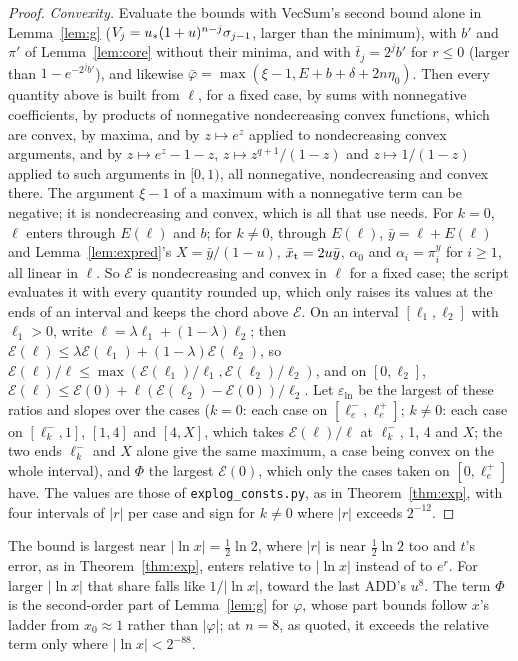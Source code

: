 \begin{proof}
\emph{Convexity.} Evaluate the bounds with VecSum's second bound alone in Lemma~\ref{lem:g} ($V_j = u_{*}(1+u)^{n-j}
\sigma_{j-1}$, larger than the minimum), with $b'$ and $\pi'$ of Lemma~\ref{lem:core} without their minima, and with
$\bar t_j = 2^jb'$ for $r \le 0$ (larger than $1 - e^{-2^jb'}$), and likewise $\bar \varphi = \max(\xi - 1, E + b + \delta +
2n\eta_0)$. Then every quantity above is built from $\ell$, for a fixed case, by sums with nonnegative coefficients, by
products of nonnegative nondecreasing convex functions, which are convex, by maxima, and by $z \mapsto e^z$ applied to
nondecreasing convex arguments, and by $z \mapsto e^z - 1 - z$, $z \mapsto z^{q+1}/(1 - z)$ and $z \mapsto 1/(1-z)$
applied to such arguments in $[0, 1)$, all nonnegative, nondecreasing and convex there. The argument $\xi - 1$ of a
maximum with a nonnegative term can be negative; it is nondecreasing and convex, which is all that use needs. For $k =
0$, $\ell$ enters through $E(\ell)$ and $b$; for $k \ne 0$, through $E(\ell)$, $\bar y = \ell + E(\ell)$ and
Lemma~\ref{lem:expred}'s $X = \bar y/(1-u)$, $\bar x_{\rm t} = 2u\bar y$, $\alpha_0$ and $\alpha_i = \pi^y_i$ for $i \ge
1$, all linear in $\ell$. So $\mathcal E$ is nondecreasing and convex in $\ell$ for a fixed case; the script evaluates
it with every quantity rounded up, which only raises its values at the ends of an interval and keeps the chord above
$\mathcal E$. On an interval $[\ell_1, \ell_2]$ with $\ell_1 > 0$, write $\ell = \lambda\ell_1 + (1 -
\lambda)\ell_2$; then $\mathcal E(\ell) \le \lambda\mathcal E(\ell_1) + (1-\lambda)\mathcal E(\ell_2)$, so $\mathcal
E(\ell)/\ell \le \max(\mathcal E(\ell_1)/\ell_1, \mathcal E(\ell_2)/\ell_2)$, and on $[0, \ell_2]$, $\mathcal E(\ell)
\le \mathcal E(0) + \ell(\mathcal E(\ell_2) - \mathcal E(0))/\ell_2$. Let $\varepsilon_{\ln}$ be the largest of these
ratios and slopes over the cases ($k = 0$: each case on $[\ell_e^-, \ell_e^+]$; $k \ne 0$: each case on $[\ell_k^-, 1]$,
$[1, 4]$ and $[4, X]$, which takes $\mathcal E(\ell)/\ell$ at $\ell_k^-$, 1, 4 and $X$; the two ends $\ell_k^-$ and
$X$ alone give the same maximum, a case being convex on the whole interval), and $\Phi$ the largest
$\mathcal E(0)$, which only the cases taken on $[0, \ell_e^+]$ have. The values are those of \texttt{explog\_consts.py},
as in Theorem~\ref{thm:exp}, with four intervals of $|r|$ per case and sign for $k \ne 0$ where $|r|$ exceeds $2^{-12}$.
\end{proof}

The bound is largest near $|\ln x| = \frac12\ln 2$, where $|r|$ is near $\frac12\ln 2$ too and $t$'s error, as in
Theorem~\ref{thm:exp}, enters relative to $|\ln x|$ instead of to $e^r$. For larger $|\ln x|$ that share falls like
$1/|\ln x|$, toward the last ADD's $u^8$. The term $\Phi$ is the
second-order part of Lemma~\ref{lem:g} for $\varphi$, whose part bounds follow $x$'s ladder from $x_0 \approx 1$ rather than
$|\varphi|$; at $n = 8$, as quoted, it exceeds the relative term only where $|\ln x| < 2^{-88}$.

